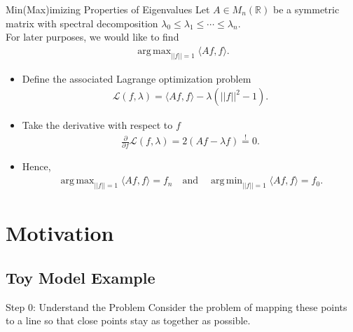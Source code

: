 \documentclass[11pt]{beamer}
\DeclareMathOperator*{\argmin}{arg\,min}
\DeclareMathOperator*{\argmax}{arg\,max}
\begin{document}
\begin{frame}{Min(Max)imizing Properties of Eigenvalues}
Let $A\in M_n(\mathbb{R})$ be a symmetric matrix with spectral decomposition $\lambda_0 \leq \lambda_1 \leq \cdots \leq \lambda_n$. \\
\vspace{0.3 cm}
For later purposes, we would like to find 
\begin{align*}
\argmax_{||f||=1} \langle Af, f \rangle.
\end{align*}
\begin{itemize}
\pause
\item Define the associated Lagrange optimization problem
\begin{align*}
\mathcal{L}(f, \lambda) = \langle Af, f \rangle -\lambda(||f||^2 - 1).
\end{align*}
\pause
\item Take the derivative with respect to $f$
\begin{align*}
\frac{\partial}{\partial f} \mathcal{L}(f, \lambda) = 2(Af - \lambda f )\stackrel{!}{=} 0.
\end{align*}
\pause
\item Hence, 
\begin{align*}
\argmax_{||f||=1} \langle Af, f \rangle = f_n
\quad \text{and}\quad
\argmin_{||f||=1} \langle Af, f \rangle = f_0.
\end{align*}
\end{itemize}
\end{frame}

\section{Motivation}

\subsection{Toy Model Example}

\begin{frame}{Step 0: Understand the Problem}
Consider the problem of mapping these points to a line so that close points stay as together as possible. 
\begin{figure}[h]
\begin{center}
\end{center}
\end{figure}
\end{frame}
\end{document}
